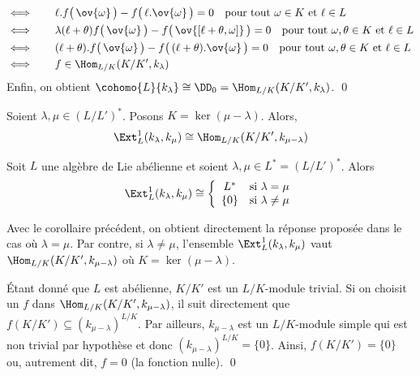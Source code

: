 \begin{Prop}
\begin{pre}
\begin{align*}
&\Longleftrightarrow \qquad \ell.f\big(\,\ov{\omega}\,\big) - f\big(\,\ell.\ov{\omega}\,\big) = 0 \quad \text{pour tout } \omega \in K \text{ et } \ell \in L\\
&\Longleftrightarrow \qquad \lambda(\ell + \theta)f\big(\,\ov{\omega}\,\big) - f\big(\,\ov{[\ell+\theta,\omega]}\,\big) = 0 \quad \text{pour tout } \omega, \theta \in K \text{ et } \ell \in L\\
&\Longleftrightarrow \qquad (\ell + \theta).f\big(\,\ov{\omega}\,\big) - f\big(\,(\ell+\theta).\ov{\omega}\,\big) = 0 \quad \text{pour tout } \omega, \theta \in K \text{ et } \ell \in L\\
&\Longleftrightarrow \qquad f \in \Hom_{L/K}(K/K',k_\lambda)\\
\end{align*}
Enfin, on obtient $\cohomo{L}{k_\lambda} \cong \DD_0 = \Hom_{L/K}(K/K',k_\lambda)$. \qed
\end{pre}
\end{Prop}

\begin{Cor} \label{extdim1} Soient $\lambda,\mu \in (L/L')^*$. Posons $K = \ker (\mu - \lambda)$. Alors,
$$ \Ext_L^1(k_\lambda,k_\mu) \cong \Hom_{L/K}(K/K',k_{\mu - \lambda}) $$
\end{Cor}

\begin{Cor} \label{extab} Soit $L$ une algèbre de Lie abélienne et soient $\lambda, \mu \in L^* = (L/L')^*$. Alors
$$ \Ext_L^1(k_\lambda,k_\mu) \cong \left\{\begin{array}{cl} L^* & \text{si } \lambda = \mu \\ \{0\} & \text{si } \lambda \neq \mu\end{array}\right. $$
\begin{pre} Avec le corollaire précédent, on obtient directement la réponse proposée dans le cas où $\lambda = \mu$. Par contre, si $\lambda \neq \mu$, l'ensemble $\Ext_L^1(k_\lambda,k_\mu)$ vaut $\Hom_{L/K}(K/K',k_{\mu - \lambda})$ où $K = \ker (\mu - \lambda)$. 

Étant donné que $L$ est abélienne, $K/K'$ est un $L/K$-module trivial. Si on choisit un $f$ dans $\Hom_{L/K}(K/K',k_{\mu - \lambda})$, il suit directement que $f(K/K') \subseteq (k_{\mu-\lambda})^{L/K}$. Par ailleurs, $k_{\mu - \lambda}$ est un $L/K$-module simple qui est non trivial par hypothèse et donc $(k_{\mu-\lambda})^{L/K} = \{0\}$. Ainsi, $f(K/K') = \{0\}$ ou, autrement dit, $f = 0$ (la fonction nulle). \qed
\end{pre}
\end{Cor}


